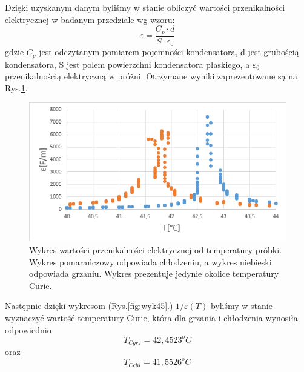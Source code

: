 \documentclass{article}
\begin{document}
Dzięki uzyskanym danym byliśmy w stanie obliczyć wartości przenikalności elektrycznej w badanym przedziale wg wzoru:
\begin{equation}
\varepsilon = \dfrac{C_{p}\cdot d}{S \cdot \varepsilon_{0}}
\end{equation}
gdzie $C_{p}$ jest odczytanym pomiarem pojemności kondensatora, d jest grubością kondensatora, S jest polem powierzchni kondensatora płaskiego, a $\varepsilon_{0}$ przenikalnością elektryczną w próżni. Otrzymane wyniki zaprezentowane są na Rys.\ref{fig:wyk3}.

\begin{figure}[!h]
	\centering
	\includegraphics[width=0.7\linewidth]{wyk3.png}
	\caption{Wykres wartości przenikalności elektrycznej od temperatury próbki. Wykres pomarańczowy odpowiada chłodzeniu, a wykres niebieski odpowiada grzaniu. Wykres prezentuje jedynie okolice temperatury Curie. }
	\label{fig:wyk3}
\end{figure}

Następnie dzięki wykresom (Rys.\ref{fig:wyk45}.) $1/\varepsilon(T)$ byliśmy w stanie wyznaczyć wartość temperatury Curie, która dla grzania i chłodzenia wynosiła odpowiednio 
\begin{equation}
T_{C grz}=42,4523^{o}C
\end{equation}
oraz
\begin{equation}
T_{C chl}=41,5526^{o}C
\end{equation}
\end{document}
